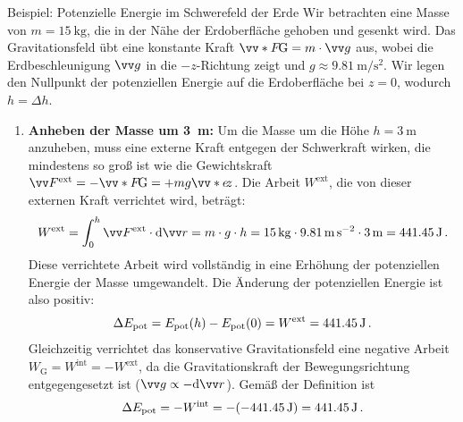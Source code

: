 \begin{examplebox}[breakable]{Beispiel: Potenzielle Energie im Schwerefeld der Erde}
    Wir betrachten eine Masse von $m = \SI{15}{\kilo\gram}$, die in der Nähe der Erdoberfläche gehoben und gesenkt wird. Das Gravitationsfeld übt eine konstante Kraft $\ivecS{F}{\text{G}} = m\cdot\ivec{g}$ aus, wobei die Erdbeschleunigung $\ivec{g}$ in die $-z$-Richtung zeigt und $g \approx \SI{9.81}{\meter\per\second\squared}$. Wir legen den Nullpunkt der potenziellen Energie auf die Erdoberfläche bei $z=0$, wodurch $h = \Delta h$. 

    \begin{enumerate}
        \item \textbf{Anheben der Masse um \SI{3}{\meter}:}
        Um die Masse um die Höhe $h = \SI{3}{\meter}$ anzuheben, muss eine externe Kraft entgegen der Schwerkraft wirken, die mindestens so groß ist wie die Gewichtskraft $\ivec{F}^{\text{ext}} = -\ivecS{F}{\text{G}} = +m g \ivecS{e}{z}$. Die Arbeit $W^{\text{ext}}$, die von dieser externen Kraft verrichtet wird, beträgt:
        \begin{equation}
            W^{\text{ext}} = \int_0^{h} \ivec{F}^{\text{ext}} \cdot \dd \ivec{r}  = m \cdot g \cdot h = \SI{15}{\kilo\gram} \cdot \SI{9.81}{\meter\per\second\squared} \cdot \SI{3}{\meter} = \SI{441.45}{\joule} \mDot
        \end{equation}
        Diese verrichtete Arbeit wird vollständig in eine Erhöhung der potenziellen Energie der Masse umgewandelt. Die Änderung der potenziellen Energie ist also positiv:
        \begin{equation}
            \Delta E_{\text{pot}} = E_{\text{pot}}(h) - E_{\text{pot}}(0) = W^{\text{ext}} = \SI{+441.45}{\joule} \,.
        \end{equation}
        Gleichzeitig verrichtet das konservative Gravitationsfeld eine negative Arbeit $W_\text{G} = W^{\text{int}} = -W^{\text{ext}}$, da die Gravitationskraft der Bewegungsrichtung entgegengesetzt ist ($\ivec{g} \propto -\dd \ivec{r}$). Gemäß der Definition ist 
        \begin{equation}
            \Delta E_{\text{pot}} = -W^{\text{int}} = -(-\SI{441.45}{\joule}) = \SI{+441.45}{\joule} \,.
        \end{equation}


\end{enumerate}
\end{examplebox}
